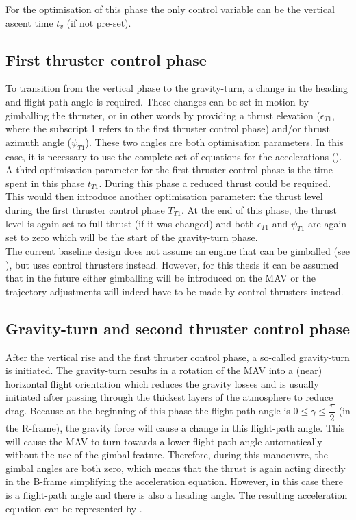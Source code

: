 For the optimisation of this phase the only control variable can be the vertical ascent time $t_{v}$ (if not pre-set). 

\subsection{First thruster control phase}
\label{subsec:first_thrust_cont}
To transition from the vertical phase to the gravity-turn, a change in the heading and flight-path angle is required. These changes can be set in motion by gimballing the thruster, or in other words by providing a thrust elevation ($\epsilon_{T1}$, where the subscript 1 refers to the first thruster control phase) and/or thrust azimuth angle ($\psi_{T1}$). These two angles are both optimisation parameters. In this case, it is necessary to use the complete set of equations for the accelerations (). A third optimisation parameter for the first thruster control phase is the time spent in this phase $t_{T1}$. During this phase a reduced thrust could be required. This would then introduce another optimisation parameter: the thrust level during the first thruster control phase $T_{T1}$. At the end of this phase, the thrust level is again set to full thrust (if it was changed) and both $\epsilon_{T1}$ and $\psi_{T1}$ are again set to zero which will be the start of the gravity-turn phase.\\
The current baseline design does not assume an engine that can be gimballed (see ), but uses control thrusters instead. However, for this thesis it can be assumed that in the future either gimballing will be introduced on the \ac{MAV} or the trajectory adjustments will indeed have to be made by control thrusters instead.




\subsection{Gravity-turn and second thruster control phase}
\label{subsec:asc_grav_turn}
After the vertical rise and the first thruster control phase, a so-called gravity-turn is initiated. The gravity-turn results in a rotation of the \ac{MAV} into a (near) horizontal flight orientation which reduces the gravity losses and is usually initiated after passing through the thickest layers of the atmosphere to reduce drag. Because at the beginning of this phase the flight-path angle is $0\leq \gamma\leq \dfrac{\pi}{2}$ (in the R-frame), the gravity force will cause a change in this flight-path angle. This will cause the \ac{MAV} to turn towards a lower flight-path angle automatically without the use of the gimbal feature. Therefore, during this manoeuvre, the gimbal angles are both zero, which means that the thrust is again acting directly in the B-frame simplifying the acceleration equation. However, in this case there is a flight-path angle and there is also a heading angle. The resulting acceleration equation can be represented by .

